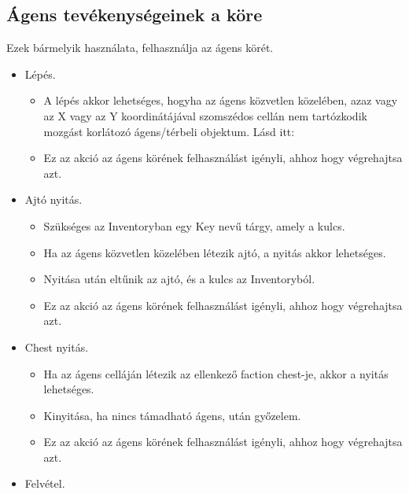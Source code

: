 \subsection{Ágens tevékenységeinek a köre}

\noindent Ezek bármelyik használata, felhasználja az ágens körét.

\begin{itemize}

    \item Lépés. 
    
    \begin{itemize}
        \item A lépés akkor lehetséges, hogyha az ágens közvetlen közelében, azaz vagy az X vagy az Y koordinátájával szomszédos cellán nem tartózkodik mozgást korlátozó ágens/térbeli objektum. Lásd itt: 
        \item Ez az akció az ágens körének felhasználást igényli, ahhoz hogy végrehajtsa azt.
    \end{itemize}

    \item Ajtó nyitás. 
    
    \begin{itemize}
        \item Szükséges az Inventoryban egy Key nevű tárgy, amely a kulcs.
        \item Ha az ágens közvetlen közelében létezik ajtó, a nyitás akkor lehetséges.
        \item Nyitása után eltűnik az ajtó, és a kulcs az Inventoryból.
        \item Ez az akció az ágens körének felhasználást igényli, ahhoz hogy végrehajtsa azt.
    \end{itemize}

    \item Chest nyitás. 
    
    \begin{itemize}
        \item Ha az ágens celláján létezik az ellenkező faction chest-je, akkor a nyitás lehetséges.
        \item Kinyitása, ha nincs támadható ágens, után győzelem.
        \item Ez az akció az ágens körének felhasználást igényli, ahhoz hogy végrehajtsa azt.
    \end{itemize}

    \item Felvétel. 
    

\end{itemize}
